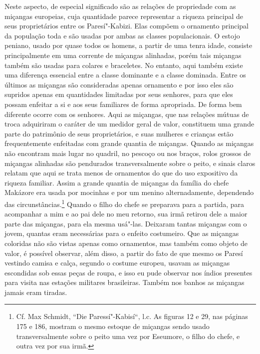 Neste aspecto, de especial significado são as relações de propriedade
com as miçangas europeias, cuja quantidade parece representar a riqueza
principal de seus proprietários entre os Paresí"-Kabizi. Elas compõem o
ornamento principal da população toda e são usadas por ambas as classes
populacionais. O estojo peniano, usado por quase todos os homens, a
partir de uma tenra idade, consiste principalmente em uma corrente de
miçangas alinhadas, porém tais miçangas também são usadas para colares e
braceletes. No entanto, aqui também existe uma diferença essencial entre
a classe dominante e a classe dominada. Entre os últimos as miçangas
são consideradas apenas ornamento e por isso eles são supridos apenas em
quantidades limitadas por seus senhores, para que eles possam enfeitar a
si e aos seus familiares de forma apropriada. De forma bem diferente
ocorre com os senhores. Aqui as miçangas, que nas relações mútuas de
troca adquiriram o caráter de um medidor geral de valor, constituem uma
grande parte do patrimônio de seus proprietários, e suas mulheres e
crianças estão frequentemente enfeitadas com grande quantia de miçangas.
Quando as miçangas não encontram mais lugar no quadril, no pescoço ou
nos braços, rolos grossos de miçangas alinhadas são pendurados
transversalmente sobre o peito, e sinais claros relatam que aqui se
trata menos de ornamentos do que do uso expositivo da riqueza familiar.
Assim a grande quantia de miçangas da família do chefe Makázore era
usada por mocinhas e por um menino alternadamente, dependendo das
circunstâncias.\footnote{Cf. Max Schmidt, ``Die Paressí"-Kabisí``, l.c. As
  figuras 12 e 29, nas páginas 175 e 186, mostram o mesmo estoque de
  miçangas sendo usado transversalmente sobre o peito uma vez por
  Eseumore, o filho do chefe, e outra vez por sua irmã.} Quando o filho
do chefe se preparava para a partida, para acompanhar a mim e ao pai
dele no meu retorno, sua irmã retirou dele a maior parte das miçangas,
para ela mesma usá"-las. Deixaram tantas miçangas com o jovem, quantas
eram necessárias para o enfeito costumeiro. Que as miçangas coloridas
não são vistas apenas como ornamentos, mas também como objeto de valor,
é possível observar, além disso, a partir do fato de que mesmo os Paresí
vestindo camisa e calça, segundo o costume europeu, usavam as miçangas
escondidas sob essas peças de roupa, e isso eu pude observar nos índios
presentes para visita nas estações militares brasileiras. Também nos
banhos as miçangas jamais eram tiradas.

